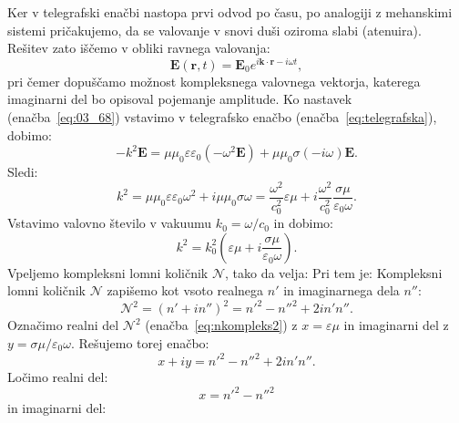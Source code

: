 Ker v telegrafski enačbi nastopa prvi odvod po času, po analogiji z mehanskimi
sistemi pričakujemo, da se valovanje v snovi duši oziroma slabi (atenuira). 
Rešitev zato iščemo v obliki ravnega valovanja:
\begin{equation}
\mathbf{E}(\mathbf{r},t) = \mathbf{E}_0 e^{i\mathbf{k}\cdot \mathbf{r} - i\omega t},
\label{eq:03_68}
\end{equation}
pri čemer dopuščamo možnost kompleksnega valovnega vektorja, katerega imaginarni del
bo opisoval pojemanje amplitude. Ko nastavek (enačba~\ref{eq:03_68})
vstavimo v telegrafsko enačbo (enačba~\ref{eq:telegrafska}), dobimo:
\begin{equation}
-k^2 \mathbf{E} = \mu \mu_0\varepsilon \varepsilon_0 \left (-\omega^2 \mathbf{E}\right)
+ \mu \mu_0 \sigma \left(-i \omega\right)\mathbf{E}.
\label{eq:03_69}
\end{equation}
Sledi:
\begin{equation}
k^2 = \mu \mu_0\varepsilon \varepsilon_0 \omega^2 + i \mu \mu_0 \sigma\omega = 
\frac{\omega^2}{c_0^2} \varepsilon \mu  + i \frac{\omega^2}{c_0^2}\frac{\sigma \mu}{\varepsilon_0\omega}.
\label{eq:03_70}
\end{equation}
Vstavimo valovno število v vakuumu $k_0 = \omega/c_0$ in dobimo:
\begin{equation}
k^2 = k_0^2 \left( \varepsilon \mu + i \frac{\sigma \mu}{\varepsilon_0\omega} 
\right)\!\!.
\label{eq:03_71}
\end{equation}
Vpeljemo kompleksni lomni količnik $\mathcal{N}$, tako da velja:
Pri tem je:
Kompleksni lomni količnik $\mathcal{N}$ zapišemo kot vsoto realnega $n'$ in imaginarnega
dela $n''$:
\begin{equation}
\mathcal{N}^2 = (n'+in'')^2 = n'^2 -n''^2 + 2i n'n''.
\label{eq:03_72}
\end{equation}
Označimo realni del $\mathcal{N}^2$ (enačba~\ref{eq:nkompleks2})
z $x = \varepsilon \mu$ in imaginarni del z $y = \sigma \mu/\varepsilon_0\omega$.  
Rešujemo torej enačbo:
\begin{equation}
x + iy = n'^2 -n''^2 + 2i n'n''.
\label{eq:03_72a}
\end{equation}
Ločimo realni del:
\begin{equation}
x = n'^2 -n''^2
\label{eq:03_73}
\end{equation}
in imaginarni del:
